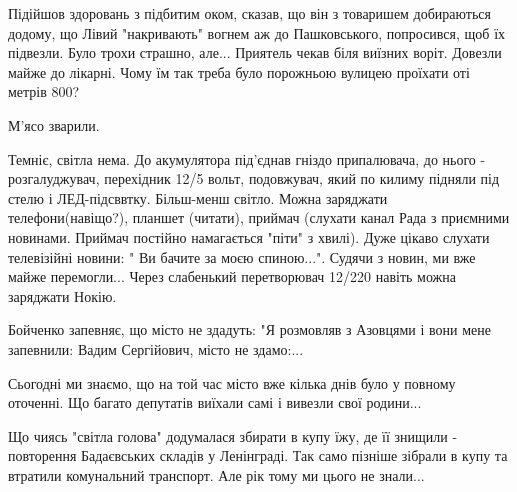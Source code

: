 Підійшов здоровань з підбитим оком, сказав, що він з товаришем добираються
додому, що Лівий "накривають" вогнем аж до Пашковського, попросився, щоб їх
підвезли. Було трохи страшно, але... Приятель чекав біля виїзних воріт. Довезли
майже до лікарні. Чому їм так треба було порожньою вулицею проїхати оті метрів
800?

М'ясо зварили.

Темніє, світла нема. До акумулятора під'єднав гніздо припалювача, до нього -
розгалуджувач, перехідник 12/5 вольт, подовжувач, який по килиму підняли під
стелю і ЛЕД-підсввтку. Більш-менш світло. Можна заряджати телефони(навіщо?),
планшет (читати), приймач (слухати канал Рада з приємними новинами. Приймач
постійно намагається "піти" з хвилі). Дуже цікаво слухати телевізійні новини: "
Ви бачите за моєю спиною...". Судячи з новин, ми вже майже перемогли... Через
слабенький перетворювач 12/220 навіть можна заряджати Нокію. 

Бойченко запевняє, що місто не здадуть: "Я розмовляв з Азовцями і вони мене
запевнили: Вадим Сергійович, місто не здамо:...

Сьогодні ми знаємо, що на той час місто вже кілька  днів було у повному
оточенні. Що багато депутатів виїхали самі і вивезли свої родини...

Що чиясь "світла голова" додумалася збирати в купу їжу, де її знищили -
повторення Бадаєвських складів у Ленінграді. Так само пізніше зібрали в купу та
втратили комунальний транспорт. Але рік тому ми цього не знали...

